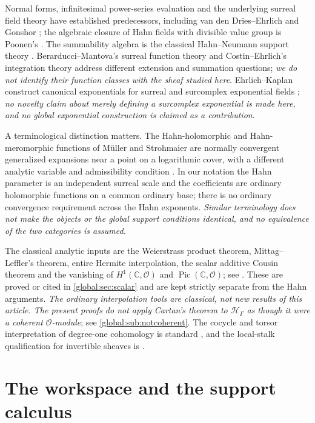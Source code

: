 \documentclass[11pt,letterpaper]{article}
\theoremstyle{definition}
\theoremstyle{remark}
\newcommand{\C}{\mathbb C}
\newcommand{\OO}{\mathcal O}
\newcommand{\HH}{\mathscr H_\Gamma}
\newcommand{\Pic}{\operatorname{Pic}}
\numberwithin{equation}{section}
\begin{document}
Normal forms, infinitesimal power-series evaluation and the underlying surreal field theory have established predecessors, including van den Dries--Ehrlich \cite{vdDE} and Gonshor \cite{Gonshor}; the algebraic closure of Hahn fields with divisible value group is Poonen's \cite[Corollary~4]{Poonen}. The summability algebra is the classical Hahn--Neumann support theory \cite{Neumann}. Berarducci--Mantova's surreal function theory \cite{BM} and Costin--Ehrlich's integration theory \cite{CE} address different extension and summation questions; \emph{we do not identify their function classes with the sheaf studied here}. Ehrlich--Kaplan construct canonical exponentials for surreal and surcomplex exponential fields \cite{EK}; \emph{no novelty claim about merely defining a surcomplex exponential is made here, and no global exponential construction is claimed as a contribution}.

A terminological distinction matters. The Hahn-holomorphic and Hahn-meromorphic functions of M\"uller and Strohmaier are normally convergent generalized expansions near a point on a logarithmic cover, with a different analytic variable and admissibility condition \cite[Definitions~2.3 and~2.5]{MS}. In our notation the Hahn parameter is an independent surreal scale and the coefficients are ordinary holomorphic functions on a common ordinary base; there is no ordinary convergence requirement across the Hahn exponents. \emph{Similar terminology does not make the objects or the global support conditions identical, and no equivalence of the two categories is assumed.}

The classical analytic inputs are the Weierstrass product theorem, Mittag--Leffler's theorem, entire Hermite interpolation, the scalar additive Cousin theorem and the vanishing of $H^1(\C,\OO)$ and $\Pic(\C,\OO)$; see \cite{Ahlfors,McMullen,Demailly}. These are proved or cited in \cref{global:sec:scalar} and are kept strictly separate from the Hahn arguments. \emph{The ordinary interpolation tools are classical, not new results of this article. The present proofs do not apply Cartan's theorem to $\HH$ as though it were a coherent $\OO$-module}; see \cref{global:sub:notcoherent}. The cocycle and torsor interpretation of degree-one cohomology is standard \cite[Tag~02FQ]{Stacks}, and the local-stalk qualification for invertible sheaves is \cite[Tag~09NT]{Stacks}.

\section{The workspace and the support calculus}\label{global:sec:workspace}
\end{document}
